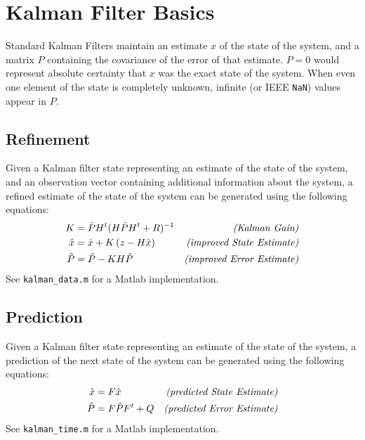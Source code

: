 \section{Kalman Filter Basics}

Standard Kalman Filters maintain an estimate $x$ of the state of the
system, and a matrix $P$ containing the covariance of the error of that
estimate. $P=0$ would represent absolute certainty that $x$ was the exact
state of the system. When even one element of the state is completely
unknown, infinite (or IEEE \verb|NaN|) values appear in $P$.

\subsection{Refinement}
Given a Kalman filter state
representing an estimate of the state of the system,
and an observation vector containing additional information
about the system,
a refined estimate of the state of the system
can be generated using the following equations:
\begin{subequations}
\label{kalmandata}
\begin{align}
  K & = {\tilde P} H^t (H {\tilde P} H^t + R)^{-1}
  & \mbox{\it (Kalman Gain)}
\label{kalmandatak}
\\
  {\hat x} & = {\tilde x} + K \left( z - H {\tilde x} \right)
  & \mbox{\it (improved State Estimate)}
\label{kalmandatax}
\\
  {\hat P} & = {\tilde P} - K H {\tilde P}
  & \mbox{\it (improved Error Estimate)}
\label{kalmandatap}
\end{align}
\end{subequations}
See \verb|kalman_data.m|
for a Matlab implementation.

\subsection{Prediction}
Given a Kalman filter state
representing an estimate of the state of the system,
a prediction of the next state of the system
can be generated using the following equations:
\begin{subequations}
\label{kalmantime}
\begin{align}
  {\tilde x} & = F {\hat x}
  & \mbox{\it (predicted State Estimate)}
\label{kalmantimex}
\\
  {\tilde P} & = F {\hat P} F^t + Q
  & \mbox{\it (predicted Error Estimate)}
\label{kalmantimep}
\end{align}
\end{subequations}
See \verb|kalman_time.m|
for a Matlab implementation.
